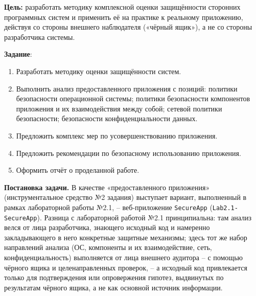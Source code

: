 
\textbf{Цель:} разработать методику комплексной оценки защищённости
сторонних программных систем и применить её на практике к реальному
приложению, действуя со стороны внешнего наблюдателя («чёрный ящик»), а
не со стороны разработчика системы.

\vspace{1em}

\textbf{Задание}:
\begin{enumerate}
  \item Разработать методику оценки защищённости систем.
  \item Выполнить анализ предоставленного приложения с позиций: политики
  безопасности операционной системы; политики безопасности компонентов
  приложения и их взаимодействия между собой; сетевой политики
  безопасности; безопасности конфиденциальности данных.
  \item Предложить комплекс мер по усовершенствованию приложения.
  \item Предложить рекомендации по безопасному использованию приложения.
  \item Оформить отчёт о проделанной работе.
\end{enumerate}

\textbf{Постановка задачи.} В качестве «предоставленного приложения»
(инструментальное средство №2 задания) выступает вариант, выполненный в
рамках лабораторной работы №2.1, -- веб-приложение \texttt{SecureApp}
(\texttt{Lab2.1-SecureApp}). Разница с лабораторной работой №2.1
принципиальна: там анализ велся от лица разработчика, знающего исходный
код и намеренно закладывающего в него конкретные защитные механизмы;
здесь тот же набор направлений анализа (ОС, компоненты и их
взаимодействие, сеть, конфиденциальность) выполняется от лица внешнего
аудитора -- с помощью чёрного ящика и целенаправленных проверок, --
а исходный код привлекается только для подтверждения или опровержения
гипотез, выдвинутых по результатам чёрного ящика, а не как основной
источник информации.
